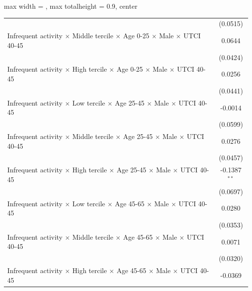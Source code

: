 \begin{table}[htbp]
\begin{adjustbox}{max width = \textwidth, max totalheight = 0.9\textheight, center}
\begin{tabular}{lc}
                                                                                                                 & (0.0515)\\   
         Infrequent activity $\times$ Middle tercile $\times$ Age 0-25 $\times$ Male $\times$ UTCI 40-45         & 0.0644\\   
                                                                                                                 & (0.0424)\\   
         Infrequent activity $\times$ High tercile $\times$ Age 0-25 $\times$ Male $\times$ UTCI 40-45           & 0.0256\\   
                                                                                                                 & (0.0441)\\   
         Infrequent activity $\times$ Low tercile $\times$ Age 25-45 $\times$ Male $\times$ UTCI 40-45           & -0.0014\\   
                                                                                                                 & (0.0599)\\   
         Infrequent activity $\times$ Middle tercile $\times$ Age 25-45 $\times$ Male $\times$ UTCI 40-45        & 0.0276\\   
                                                                                                                 & (0.0457)\\   
         Infrequent activity $\times$ High tercile $\times$ Age 25-45 $\times$ Male $\times$ UTCI 40-45          & -0.1387$^{**}$\\   
                                                                                                                 & (0.0697)\\   
         Infrequent activity $\times$ Low tercile $\times$ Age 45-65 $\times$ Male $\times$ UTCI 40-45           & 0.0280\\   
                                                                                                                 & (0.0353)\\   
         Infrequent activity $\times$ Middle tercile $\times$ Age 45-65 $\times$ Male $\times$ UTCI 40-45        & 0.0071\\   
                                                                                                                 & (0.0320)\\   
         Infrequent activity $\times$ High tercile $\times$ Age 45-65 $\times$ Male $\times$ UTCI 40-45          & -0.0369\\   

\end{tabular}
\end{adjustbox}
\end{table}
